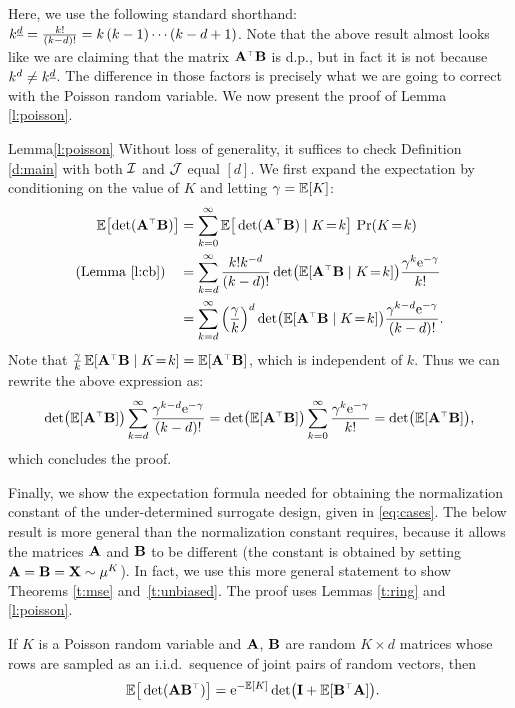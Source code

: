 \documentclass[../../thesis.tex]{subfiles}
\begin{document}
\noindent
Here, we use the following standard shorthand: ${k^{\underline{d}}} =
  \frac{k!}{(k-d)!} = k\,(k-1)\dotsm(k-d+1)$. Note that the above result
almost looks like we are claiming that the matrix $\A^\top\B$ is d.p.,
but in fact it is not because $k^d\neq {k^{\underline{d}}}$. The difference
in those factors is precisely what we are going to correct with the
Poisson random variable. We now present the proof of Lemma
\ref{l:poisson}.
\begin{proofof}{Lemma}{\ref{l:poisson}}
  Without loss of generality, it suffices to check Definition \ref{d:main} with both $\mathcal I$ and
  $\mathcal{J}$ equal $[d]$. We first expand the expectation by
  conditioning on the value of $K$ and letting $\gamma=\mathbb E[K]$:
  \begin{align*}
    \E\big[\!\det(\A^\top\B)\big]
          & = \sum_{k=0}^\infty
    \E\big[\det(\A^\top\B)\mid K\!=\!k\big]\
    \Pr(K\!=\!k)                     \\
    \text{(Lemma \ref{l:cb})}
    \quad & =
    \sum_{k=d}^\infty\frac{k! k^{-d}}{(k-d)!}\det\!\big(\E[\A^\top\B\mid
      K\!=\!k]\big)
    \frac{\gamma^k\ee^{-\gamma}}{k!} \\
          & =\sum_{k=d}^\infty
    \Big(\frac\gamma k\Big)^d\det\!\big(\E[\A^\top\B\mid K\!=\!k]\big)
    \frac{\gamma^{k-d}\ee^{-\gamma}}{(k-d)!}.
  \end{align*}
  Note that $\frac\gamma k\,\E[\A^\top\B\mid K\!=\!k]=\E[\A^\top\B]$,
  which is independent of $k$. Thus we can rewrite the above
  expression as:
  \begin{align*}
    \det\!\big(\E[\A^\top\B]\big)\sum_{k=d}^\infty\frac{\gamma^{k-d}\ee^{-\gamma}}{(k-d)!}
    =
    \det\!\big(\E[\A^\top\B]\big)\sum_{k=0}^\infty
    \frac{\gamma^{k}\ee^{-\gamma}}{k!}=\det\!\big(\E[\A^\top\B]\big),
  \end{align*}
  which concludes the proof.
\end{proofof}


Finally, we show the expectation formula needed for obtaining the
normalization constant of the under-determined surrogate design, given
in \eqref{eq:cases}.
The below result is more general than the normalization constant
requires, because it allows the matrices $\mathbf A$ and $\mathbf B$ to be different
(the constant is obtained by setting $\mathbf A=\mathbf B=\mathbf X\sim\mu^K$).
In fact, we use this more general statement to show Theorems
\ref{t:mse} and~\ref{t:unbiased}. The proof uses
Lemmas \ref{t:ring} and \ref{l:poisson}.
\begin{lemma}\label{l:normalization}
  If $K$ is a Poisson random variable and $\mathbf A$, $\mathbf B$ are random $K\times d$
  matrices whose rows  are sampled as an i.i.d.~sequence of joint pairs of
  random vectors, then
  \begin{align*}
    \E\big[\det(\A\B^\top)\big] & = \ee^{-\E[K]}\det\!\big(\I + \E[\B^\top\A]\big).
  \end{align*}
\end{lemma}
\end{document}
